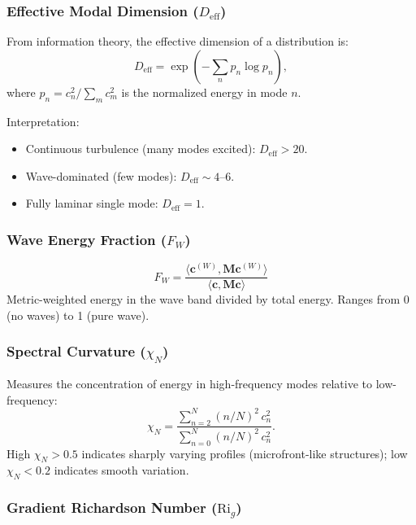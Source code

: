 \documentclass[11pt,a4paper]{article}
\begin{document}
\subsubsection{Effective Modal Dimension ($D_{\mathrm{eff}}$)}

From information theory, the effective dimension of a distribution is:
\begin{equation}
D_{\mathrm{eff}} = \exp\left( -\sum_n p_n \log p_n \right),
\label{eq:d_eff}
\end{equation}
where $p_n = c_n^2 / \sum_m c_m^2$ is the normalized energy in mode $n$.

Interpretation:
\begin{itemize}
  \item Continuous turbulence (many modes excited): $D_{\mathrm{eff}} > 20$.
  \item Wave-dominated (few modes): $D_{\mathrm{eff}} \sim 4$--$6$.
  \item Fully laminar single mode: $D_{\mathrm{eff}} = 1$.
\end{itemize}

\subsubsection{Wave Energy Fraction ($F_W$)}

\begin{equation}
F_W = \frac{\langle \mathbf{c}^{(W)}, \mathbf{M} \mathbf{c}^{(W)} \rangle}{\langle \mathbf{c}, \mathbf{M} \mathbf{c} \rangle}
\label{eq:f_w}
\end{equation}
Metric-weighted energy in the wave band divided by total energy. Ranges from 0 (no waves) to 1 (pure wave).

\subsubsection{Spectral Curvature ($\chi_N$)}

Measures the concentration of energy in high-frequency modes relative to low-frequency:
\begin{equation}
\chi_N = \frac{\sum_{n=2}^{N} (n/N)^2 \, c_n^2}{\sum_{n=0}^{N} (n/N)^2 \, c_n^2}.
\label{eq:chi_n}
\end{equation}
High $\chi_N > 0.5$ indicates sharply varying profiles (microfront-like structures); low $\chi_N < 0.2$ indicates smooth variation.

\subsubsection{Gradient Richardson Number ($\mathrm{Ri}_g$)}
\end{document}
